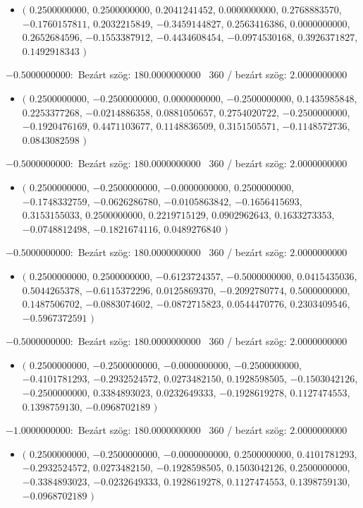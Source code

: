 \documentclass[14pt,a4paper]{article}
\begin{document}
\begin{itemize}
\item
$\big($
$0.2500000000$, $0.2500000000$, $0.2041241452$, $0.0000000000$, $0.2768883570$, $-0.1760157811$, $0.2032215849$, $-0.3459144827$, $0.2563416386$, $0.0000000000$, $0.2652684596$, $-0.1553387912$, $-0.4434608454$, $-0.0974530168$, $0.3926371827$, $0.1492918343$
$\big)$
\end{itemize}
$-0.5000000000$:\
Bezárt szög: $180.0000000000$ \
360 / bezárt szög: $2.0000000000$\
\begin{itemize}
\item
$\big($
$0.2500000000$, $-0.2500000000$, $0.0000000000$, $-0.2500000000$, $0.1435985848$, $0.2253377268$, $-0.0214886358$, $0.0881050657$, $0.2754020722$, $-0.2500000000$, $-0.1920476169$, $0.4471103677$, $0.1148836509$, $0.3151505571$, $-0.1148572736$, $0.0843082598$
$\big)$
\end{itemize}
$-0.5000000000$:\
Bezárt szög: $180.0000000000$ \
360 / bezárt szög: $2.0000000000$\
\begin{itemize}
\item
$\big($
$0.2500000000$, $-0.2500000000$, $-0.0000000000$, $0.2500000000$, $-0.1748332759$, $-0.0626286780$, $-0.0105863842$, $-0.1656415693$, $0.3153155033$, $0.2500000000$, $0.2219715129$, $0.0902962643$, $0.1633273353$, $-0.0748812498$, $-0.1821674116$, $0.0489276840$
$\big)$
\end{itemize}
$-0.5000000000$:\
Bezárt szög: $180.0000000000$ \
360 / bezárt szög: $2.0000000000$\
\begin{itemize}
\item
$\big($
$0.2500000000$, $0.2500000000$, $-0.6123724357$, $-0.5000000000$, $0.0415435036$, $0.5044265378$, $-0.6115372296$, $0.0125869370$, $-0.2092780774$, $0.5000000000$, $0.1487506702$, $-0.0883074602$, $-0.0872715823$, $0.0544470776$, $0.2303409546$, $-0.5967372591$
$\big)$
\end{itemize}
$-0.5000000000$:\
Bezárt szög: $180.0000000000$ \
360 / bezárt szög: $2.0000000000$\
\begin{itemize}
\item
$\big($
$0.2500000000$, $-0.2500000000$, $-0.0000000000$, $-0.2500000000$, $-0.4101781293$, $-0.2932524572$, $0.0273482150$, $0.1928598505$, $-0.1503042126$, $-0.2500000000$, $0.3384893023$, $0.0232649333$, $-0.1928619278$, $0.1127474553$, $0.1398759130$, $-0.0968702189$
$\big)$
\end{itemize}
$-1.0000000000$:\
Bezárt szög: $180.0000000000$ \
360 / bezárt szög: $2.0000000000$\
\begin{itemize}
\item
$\big($
$0.2500000000$, $-0.2500000000$, $-0.0000000000$, $0.2500000000$, $0.4101781293$, $-0.2932524572$, $0.0273482150$, $-0.1928598505$, $0.1503042126$, $0.2500000000$, $-0.3384893023$, $-0.0232649333$, $0.1928619278$, $0.1127474553$, $0.1398759130$, $-0.0968702189$
$\big)$
\end{itemize}
\end{document}
